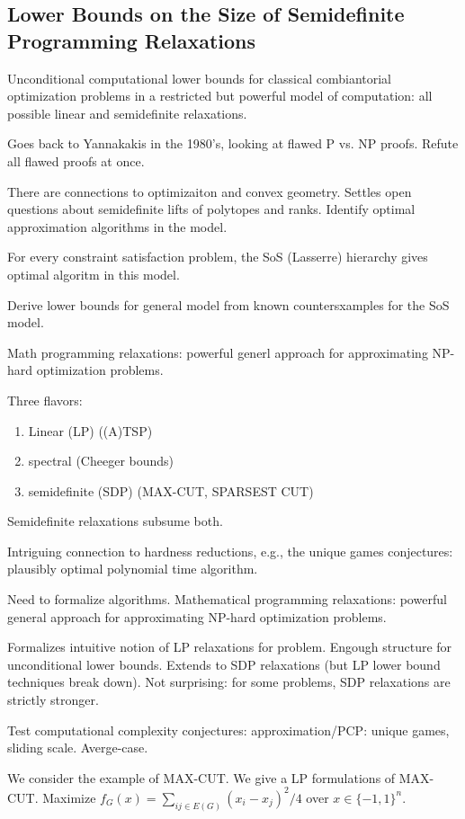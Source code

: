 \subsection{Lower Bounds on the Size of Semidefinite Programming Relaxations}
Unconditional computational lower bounds for classical combiantorial optimization problems in a restricted but powerful model of computation: all possible linear and semidefinite relaxations.

Goes back to Yannakakis in the 1980's, looking at flawed P vs. NP proofs. Refute all flawed proofs at once.

There are connections to optimizaiton and convex geometry. Settles open questions about semidefinite lifts of polytopes and ranks.
Identify optimal approximation  algorithms in the model. 

For every constraint satisfaction problem, the 
SoS (Lasserre) hierarchy gives optimal algoritm in this model.

Derive lower bounds for general model from known countersxamples for the SoS model.

Math programming relaxations: powerful generl approach for approximating NP-hard optimization problems. 

Three flavors:
\begin{enumerate}
\item
Linear (LP) ((A)TSP)
\item
spectral (Cheeger bounds)
\item
semidefinite (SDP) (MAX-CUT, SPARSEST CUT)
\end{enumerate}

Semidefinite relaxations subsume both.

Intriguing connection to hardness reductions, e.g., the unique games conjectures: plausibly optimal polynomial time algorithm.

Need to formalize algorithms. Mathematical programming relaxations: powerful general approach for approximating NP-hard optimization problems. 

Formalizes intuitive notion of LP relaxations for problem. Engough structure for unconditional lower bounds. Extends to SDP relaxations (but LP lower bound techniques break down). Not surprising: for some problems, SDP relaxations are strictly stronger.

Test computational complexity conjectures: approximation/PCP: unique games, sliding scale. Averge-case.

We consider the example of MAX-CUT. We give a LP formulations of MAX-CUT. Maximize $f_G(x)=\sum_{ij\in E(G)} (x_i-x_j)^2/4$ over $x\in \{-1,1\}^n$.

